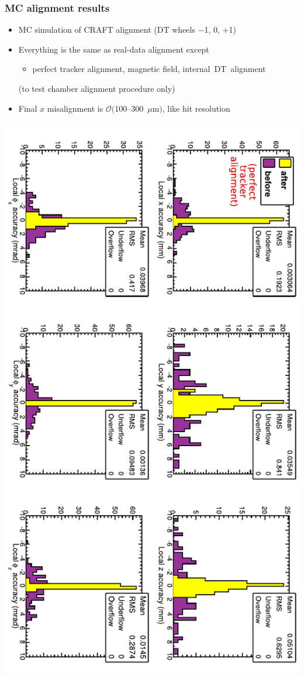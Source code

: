\documentclass[compress]{beamer}
\begin{document}
\begin{frame}
\frametitle{MC alignment results}

\begin{itemize}
\item MC simulation of CRAFT alignment (DT wheels $-$1, 0, $+$1)
\item Everything is the same as real-data alignment except
\begin{itemize}
\item perfect tracker alignment, magnetic field, \mbox{internal DT alignment\hspace{-1 cm}}
\end{itemize}
(to test chamber alignment procedure only)
\item Final $x$ misalignment is $\mathcal{O}($100--300~$\mu$m$)$, like hit resolution
\end{itemize}

\includegraphics[height=0.95\linewidth, angle=90]{hip_MC_simple2.pdf}
\end{frame}
\end{document}
